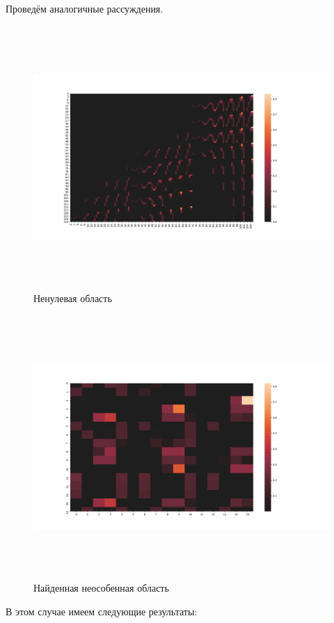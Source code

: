 \documentclass[12pt,a4paper]{scrartcl}
\begin{document}
Проведём аналогичные рассуждения.

\begin{figure}[H]
    \centering
    \includegraphics[width=14cm, height=10cm]{fig/nonzero_2.png}
	\caption{Ненулевая область}
\end{figure}

\begin{figure}[H]
    \centering
    \includegraphics[width=14cm, height=10cm]{fig/nonspecial_2.png}
	\caption{Найденная неособенная область}
\end{figure}

 В этом случае имеем следующие результаты:
\end{document}
